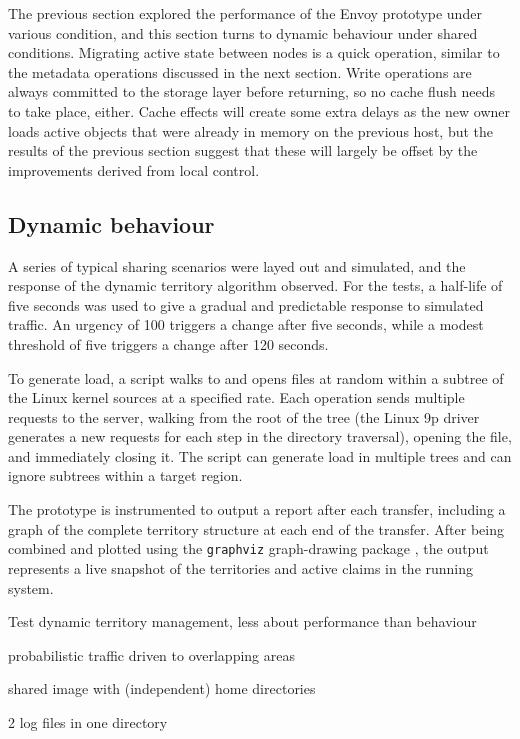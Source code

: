 The previous section explored the performance of the Envoy prototype under various condition, and this section turns to dynamic behaviour under shared conditions. Migrating active state between nodes is a quick operation, similar to the metadata operations discussed in the next section. Write operations are always committed to the storage layer before returning, so no cache flush needs to take place, either. Cache effects will create some extra delays as the new owner loads active objects that were already in memory on the previous host, but the results of the previous section suggest that these will largely be offset by the improvements derived from local control.

\subsection{Dynamic behaviour}

A series of typical sharing scenarios were layed out and simulated, and the response of the dynamic territory algorithm observed. For the tests, a half-life of five seconds was used to give a gradual and predictable response to simulated traffic. An urgency of 100 triggers a change after five seconds, while a modest threshold of five triggers a change after 120 seconds.

To generate load, a script walks to and opens files at random within a subtree of the Linux kernel sources at a specified rate. Each operation sends multiple requests to the server, walking from the root of the tree (the Linux 9p driver generates a new requests for each step in the directory traversal), opening the file, and immediately closing it. The script can generate load in multiple trees and can ignore subtrees within a target region.

The prototype is instrumented to output a report after each transfer, including a graph of the complete territory structure at each end of the transfer. After being combined and plotted using the \texttt{graphviz} graph-drawing package \cite{gansner}, the output represents a live snapshot of the territories and active claims in the running system.


Test dynamic territory management, less about performance than behaviour

probabilistic traffic driven to overlapping areas

shared image with (independent) home directories

2 log files in one directory

